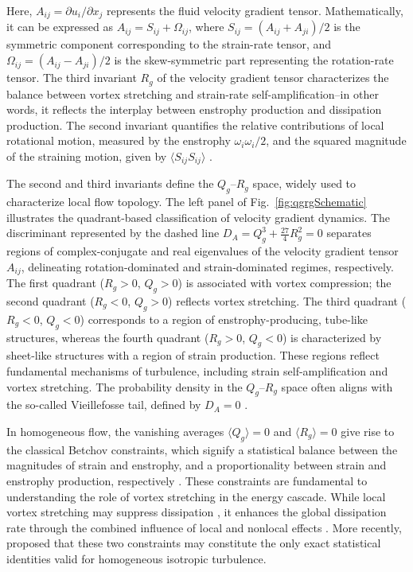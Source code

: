 \documentclass[final,3p]{elsarticle}
\begin{document}
Here,  $A_{ij} = \partial u_i / \partial x_j$ represents the fluid velocity gradient tensor. Mathematically, it can be expressed as $ A_{ij} = S_{ij} + \Omega_{ij}$, where $ S_{ij} = (A_{ij} + A_{ji})/2$ is the symmetric component corresponding to the strain-rate tensor, and $\Omega_{ij} = (A_{ij} - A_{ji})/2$ is the skew-symmetric part representing the rotation-rate tensor. The third invariant $R_g$ of the velocity gradient tensor characterizes the balance between vortex stretching and strain-rate self-amplification--in other words, it reflects the interplay between enstrophy production and dissipation production. The second invariant quantifies the relative contributions of local rotational motion, measured by the enstrophy $ \omega_i \omega_i / 2 $, and the squared magnitude of the straining motion, given by $\langle S_{ij} S_{ij} \rangle $ \cite{johnson2017restricted,johnson2024multiscale, meneveau2011lagrangian}.

The second and third invariants define the $Q_g$--$R_g$ space, widely used to characterize local flow topology. The left panel of Fig.~\ref{fig:qgrgSchematic} illustrates the quadrant-based classification of velocity gradient dynamics. The discriminant represented by the dashed line $D_A = Q_g^3 + \frac{27}{4}R_g^2 = 0$ separates regions of complex-conjugate and real eigenvalues of the velocity gradient tensor $A_{ij}$, delineating rotation-dominated and strain-dominated regimes, respectively. The first quadrant ($R_g > 0$, $Q_g > 0$) is associated with vortex compression; the second quadrant ($R_g < 0$, $Q_g > 0$) reflects vortex stretching. The third quadrant ($R_g < 0$, $Q_g < 0$) corresponds to a region of enstrophy-producing, tube-like structures, whereas the fourth quadrant ($R_g > 0$, $Q_g < 0$) is characterized by sheet-like structures with a region of strain production. These regions reflect fundamental mechanisms of turbulence, including strain self-amplification and vortex stretching. The probability density in the $Q_g$–$R_g$ space often aligns with the so-called Vieillefosse tail, defined by $D_A = 0$ \cite{vieillefosse1982local,da2008invariants}.

In homogeneous flow, the vanishing averages $\langle Q_g \rangle = 0$ and $\langle R_g \rangle = 0$ give rise to the classical Betchov constraints, which signify a statistical balance between the magnitudes of strain and enstrophy, and a proportionality between strain and enstrophy production, respectively \cite{betchov1956inequality,johnson2024multiscale}. These constraints are fundamental to understanding the role of vortex stretching in the energy cascade. While local vortex stretching may suppress dissipation \cite{tsinober2009informal}, it enhances the global dissipation rate through the combined influence of local and nonlocal effects \cite{carbone2020vortex}. More recently, \citet{carbone2022only} proposed that these two constraints may constitute the only exact statistical identities valid for homogeneous isotropic turbulence.
\end{document}
